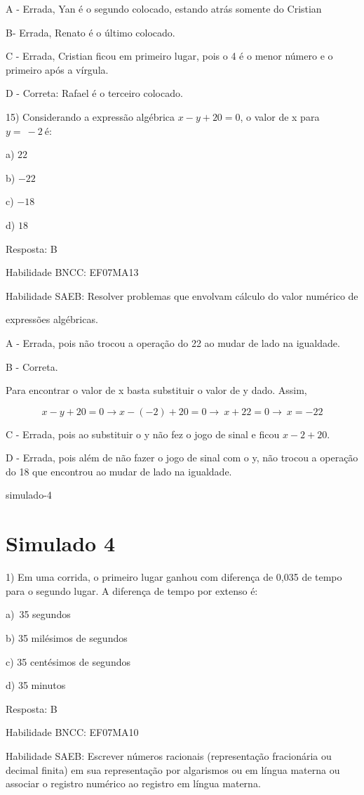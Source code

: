 {A - Errada, Yan é o segundo colocado, estando atrás somente do Cristian

B- Errada, Renato é o último colocado.

C - Errada, Cristian ficou em primeiro lugar, pois o 4 é o menor número
e o primeiro após a vírgula.

D - Correta: Rafael é o terceiro colocado.

15) Considerando a expressão algébrica \(x - y + 20 = 0\), o valor de x
para \(y = \  - 2\ \)é:

a) \(22\)

b) \(- 22\)

c) \(- 18\)

d) \(18\)

Resposta: B

Habilidade BNCC: EF07MA13

Habilidade SAEB: Resolver problemas que envolvam cálculo do valor
numérico de

expressões algébricas.

A - Errada, pois não trocou a operação do 22 ao mudar de lado na
igualdade.

B - Correta.

Para encontrar o valor de x basta substituir o valor de y dado. Assim,

\[x - y + 20 = 0 \rightarrow x - ( - 2) + 20 = 0 \rightarrow \ x + 22 = 0 \rightarrow \ x = - 22\]

C - Errada, pois ao substituir o y não fez o jogo de sinal e ficou
\(x - 2 + 20\).

D - Errada, pois além de não fazer o jogo de sinal com o y, não trocou a
operação do 18 que encontrou ao mudar de lado na igualdade.

simulado-4}{%
\section{Simulado 4}

1) Em uma corrida, o primeiro lugar ganhou com diferença de 0,035 de
tempo para o segundo lugar. A diferença de tempo por extenso é:

a)~35 segundos

b) 35 milésimos de segundos

c) 35 centésimos de segundos~

d) 35 minutos

Resposta: B~

Habilidade BNCC: EF07MA10

Habilidade SAEB: Escrever números racionais (representação fracionária
ou decimal finita) em sua representação por algarismos ou em língua
materna ou associar o registro numérico ao registro em língua materna.

}
